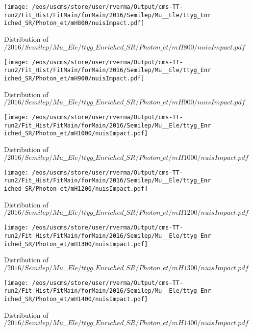 \begin{figure}
\centering
\texttt{[image: /eos/uscms/store/user/rverma/Output/cms-TT-run2/Fit\_Hist/FitMain/forMain/2016/Semilep/Mu\_\_Ele/ttyg\_Enriched\_SR/Photon\_et/mH800/nuisImpact.pdf]}
\caption{Distribution of $/2016/Semilep/Mu\_\_Ele/ttyg\_Enriched\_SR/Photon\_et/mH800/nuisImpact.pdf$}
\end{figure}

\begin{figure}
\centering
\texttt{[image: /eos/uscms/store/user/rverma/Output/cms-TT-run2/Fit\_Hist/FitMain/forMain/2016/Semilep/Mu\_\_Ele/ttyg\_Enriched\_SR/Photon\_et/mH900/nuisImpact.pdf]}
\caption{Distribution of $/2016/Semilep/Mu\_\_Ele/ttyg\_Enriched\_SR/Photon\_et/mH900/nuisImpact.pdf$}
\end{figure}

\begin{figure}
\centering
\texttt{[image: /eos/uscms/store/user/rverma/Output/cms-TT-run2/Fit\_Hist/FitMain/forMain/2016/Semilep/Mu\_\_Ele/ttyg\_Enriched\_SR/Photon\_et/mH1000/nuisImpact.pdf]}
\caption{Distribution of $/2016/Semilep/Mu\_\_Ele/ttyg\_Enriched\_SR/Photon\_et/mH1000/nuisImpact.pdf$}
\end{figure}

\begin{figure}
\centering
\texttt{[image: /eos/uscms/store/user/rverma/Output/cms-TT-run2/Fit\_Hist/FitMain/forMain/2016/Semilep/Mu\_\_Ele/ttyg\_Enriched\_SR/Photon\_et/mH1200/nuisImpact.pdf]}
\caption{Distribution of $/2016/Semilep/Mu\_\_Ele/ttyg\_Enriched\_SR/Photon\_et/mH1200/nuisImpact.pdf$}
\end{figure}

\begin{figure}
\centering
\texttt{[image: /eos/uscms/store/user/rverma/Output/cms-TT-run2/Fit\_Hist/FitMain/forMain/2016/Semilep/Mu\_\_Ele/ttyg\_Enriched\_SR/Photon\_et/mH1300/nuisImpact.pdf]}
\caption{Distribution of $/2016/Semilep/Mu\_\_Ele/ttyg\_Enriched\_SR/Photon\_et/mH1300/nuisImpact.pdf$}
\end{figure}

\begin{figure}
\centering
\texttt{[image: /eos/uscms/store/user/rverma/Output/cms-TT-run2/Fit\_Hist/FitMain/forMain/2016/Semilep/Mu\_\_Ele/ttyg\_Enriched\_SR/Photon\_et/mH1400/nuisImpact.pdf]}
\caption{Distribution of $/2016/Semilep/Mu\_\_Ele/ttyg\_Enriched\_SR/Photon\_et/mH1400/nuisImpact.pdf$}
\end{figure}

